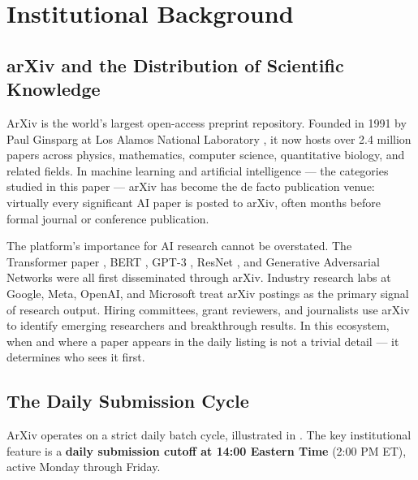 \documentclass[12pt]{article}
\begin{document}
\section{Institutional Background}

\subsection{arXiv and the Distribution of Scientific Knowledge}

ArXiv is the world's largest open-access preprint repository. Founded in 1991 by Paul Ginsparg at Los Alamos National Laboratory \citep{ginsparg2011}, it now hosts over 2.4 million papers across physics, mathematics, computer science, quantitative biology, and related fields. In machine learning and artificial intelligence --- the categories studied in this paper --- arXiv has become the de facto publication venue: virtually every significant AI paper is posted to arXiv, often months before formal journal or conference publication.

The platform's importance for AI research cannot be overstated. The Transformer paper \citep{vaswani2017}, BERT \citep{devlin2019}, GPT-3 \citep{brown2020}, ResNet \citep{he2016}, and Generative Adversarial Networks \citep{goodfellow2014} were all first disseminated through arXiv. Industry research labs at Google, Meta, OpenAI, and Microsoft treat arXiv postings as the primary signal of research output. Hiring committees, grant reviewers, and journalists use arXiv to identify emerging researchers and breakthrough results. In this ecosystem, when and where a paper appears in the daily listing is not a trivial detail --- it determines who sees it first.

\subsection{The Daily Submission Cycle}

ArXiv operates on a strict daily batch cycle, illustrated in . The key institutional feature is a \textbf{daily submission cutoff at 14:00 Eastern Time} (2:00 PM ET), active Monday through Friday.
\end{document}
